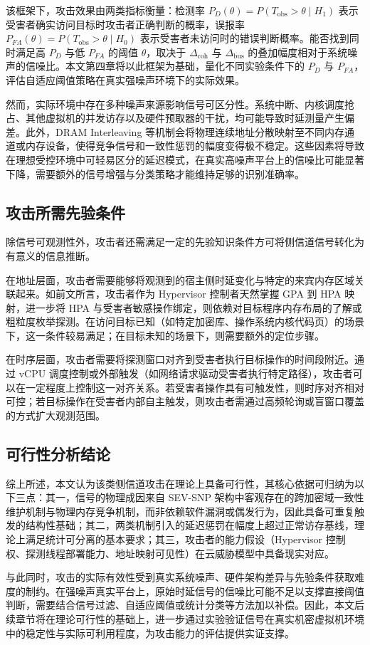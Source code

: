 该框架下，攻击效果由两类指标衡量：检测率 $P_D(\theta) = P(T_\text{obs} > \theta \mid H_1)$ 表示受害者确实访问目标时攻击者正确判断的概率，误报率 $P_{FA}(\theta) = P(T_\text{obs} > \theta \mid H_0)$ 表示受害者未访问时的错误判断概率。能否找到同时满足高 $P_D$ 与低 $P_{FA}$ 的阈值 $\theta$，取决于 $\Delta_\text{coh}$ 与 $\Delta_\text{bus}$ 的叠加幅度相对于系统噪声的信噪比。本文第四章将以此框架为基础，量化不同实验条件下的 $P_D$ 与 $P_{FA}$，评估自适应阈值策略在真实强噪声环境下的实际效果。

然而，实际环境中存在多种噪声来源影响信号可区分性。系统中断、内核调度抢占、其他虚拟机的并发访存以及硬件预取器的干扰，均可能导致时延测量产生偏差。此外，DRAM Interleaving 等机制会将物理连续地址分散映射至不同内存通道或内存设备，使得竞争信号和一致性惩罚的幅度变得极不稳定。这些因素将导致在理想受控环境中可轻易区分的延迟模式，在真实高噪声平台上的信噪比可能显著下降，需要额外的信号增强与分类策略才能维持足够的识别准确率。

\subsection{攻击所需先验条件}

除信号可观测性外，攻击者还需满足一定的先验知识条件方可将侧信道信号转化为有意义的信息推断。

在地址层面，攻击者需要能够将观测到的宿主侧时延变化与特定的来宾内存区域关联起来。如前文所言，攻击者作为 Hypervisor 控制者天然掌握 GPA 到 HPA 映射，进一步将 HPA 与受害者敏感操作绑定，则依赖对目标程序内存布局的了解或粗粒度枚举探测。在访问目标已知（如特定加密库、操作系统内核代码页）的场景下，这一条件较易满足；在目标未知的场景下，则需要额外的定位步骤。

在时序层面，攻击者需要将探测窗口对齐到受害者执行目标操作的时间段附近。通过 vCPU 调度控制或外部触发（如网络请求驱动受害者执行特定路径），攻击者可以在一定程度上控制这一对齐关系。若受害者操作具有可触发性，则时序对齐相对可控；若目标操作在受害者内部自主触发，则攻击者需通过高频轮询或盲窗口覆盖的方式扩大观测范围。

\subsection{可行性分析结论}

综上所述，本文认为该类侧信道攻击在理论上具备可行性，其核心依据可归纳为以下三点：其一，信号的物理成因来自 SEV-SNP 架构中客观存在的跨加密域一致性维护机制与物理内存竞争机制，而非依赖软件漏洞或偶发行为，因此具备可重复触发的结构性基础；其二，两类机制引入的延迟惩罚在幅度上超过正常访存基线，理论上满足统计可分离的基本要求；其三，攻击者的能力假设（Hypervisor 控制权、探测线程部署能力、地址映射可见性）在云威胁模型中具备现实对应。

与此同时，攻击的实际有效性受到真实系统噪声、硬件架构差异与先验条件获取难度的制约。在强噪声真实平台上，原始时延信号的信噪比可能不足以支撑直接阈值判断，需要结合信号过滤、自适应阈值或统计分类等方法加以补偿。因此，本文后续章节将在理论可行性的基础上，进一步通过实验验证信号在真实机密虚拟机环境中的稳定性与实际可利用程度，为攻击能力的评估提供实证支撑。

